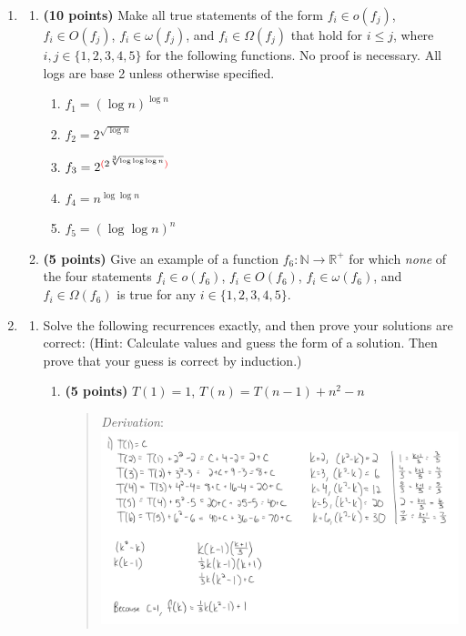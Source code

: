 \documentclass[11pt]{article}
\begin{document}
\begin{enumerate}[leftmargin=*]
\begin{enumerate}
\begin{quote}
\end{quote}
\end{enumerate}


\item
\begin{enumerate}
\item
{\bf (10 points)}
Make all true statements of the form $f_i \in o(f_j)$, $f_i \in O(f_j)$, $f_i \in \omega(f_j)$, and $f_i \in \Omega(f_j)$ that hold for $i \le j$, where $i, j \in \{1,2,3,4,5\}$ for the following functions. No proof is necessary. All logs are base 2 unless otherwise specified.
\begin{enumerate}
\item $f_1 = (\log n)^{\log n}$
\item $f_2 = 2^{\sqrt{\log n}}$
\item $f_3 = 2^{{\color{red}(}2^{\sqrt[3]{\log\log\log n}}{\color{red})}}$
\item $f_4 = n^{\log\log n}$
\item $f_5 = (\log\log n)^n$
\end{enumerate}
\item
{\bf (5 points)}
Give an example of a function $f_6: \mathbb{N} \to \mathbb{R}^+$ for which \emph{none} of the four statements $f_i \in o(f_6)$, $f_i \in O(f_6)$, $f_i \in \omega(f_6)$, and $f_i \in \Omega(f_6)$ is true for any $i \in \{1,2,3,4,5\}$.
\end{enumerate}

\item \begin{enumerate}
    \item Solve the following recurrences exactly, and then prove your solutions are correct:
    (Hint: Calculate values and guess the form of a solution. Then prove that your guess is correct by induction.)
    \begin{enumerate}
        \item
        {\bf (5 points)} 
        $T(1) = 1$, $T(n) = T(n-1) + n^2 - n$
        \begin{quote}
          \color{purple}
          \medskip
          \textit{Derivation}: \\
          \includegraphics[width=0.8\linewidth]{"./pics/4ai.png"}


\end{quote}
\end{enumerate}
\end{enumerate}
\end{enumerate}
\end{document}
